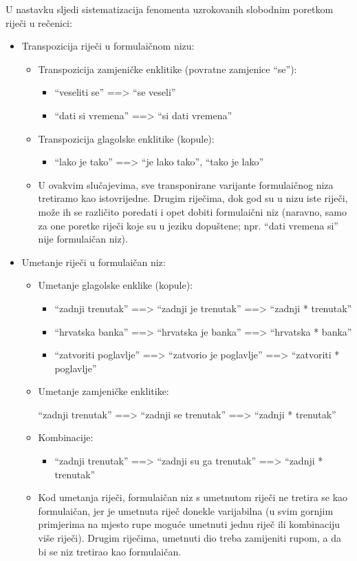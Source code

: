 \documentclass[12pt]{article}
\begin{document}
U nastavku sljedi sistematizacija fenomenta uzrokovanih slobodnim poretkom riječi u rečenici:

\begin{itemize}

\item Transpozicija riječi u formulaičnom nizu:
\begin{itemize}
\item Transpozicija zamjeničke enklitike (povratne zamjenice ``se''):
\begin{itemize}
\item ``veseliti se'' ==> ``se veseli''
\item  ``dati si vremena'' ==> ``si dati vremena''
\end{itemize}
\item Transpozicija glagolske enklitike (kopule):
\begin{itemize}
\item ``lako je tako'' ==> ``je lako tako'', ``tako je lako''
\end{itemize}
\item U ovakvim slučajevima, sve transponirane varijante formulaičnog niza tretiramo kao
istovrijedne. Drugim riječima, dok god su u nizu iste riječi, može ih se različito poredati i opet
dobiti formulaični niz (naravno, samo za one poretke riječi koje su u jeziku dopuštene; npr.
``dati vremena si'' nije formulaičan niz).
\end{itemize}

\item Umetanje riječi u formulaičan niz:

\begin{itemize}
\item Umetanje glagolske enklike (kopule):
\begin{itemize}
\item ``zadnji trenutak'' ==> ``zadnji je trenutak'' ==> ``zadnji * trenutak''
\item ``hrvatska banka'' ==> ``hrvatska je banka'' ==> ``hrvatska * banka''
\item ``zatvoriti poglavlje'' ==> ``zatvorio je poglavlje'' ==> ``zatvoriti * poglavlje''
\end{itemize} 
\item Umetanje zamjeničke enklitike:
\begin{itemize}
``zadnji trenutak'' ==> ``zadnji se trenutak'' ==> ``zadnji * trenutak''
\end{itemize}
\item Kombinacije:
\begin{itemize}
\item ``zadnji trenutak'' ==> ``zadnji su ga trenutak'' ==> ``zadnji * trenutak''
\end{itemize}
\item Kod umetanja riječi, formulaičan niz s umetnutom riječi ne tretira se kao formulaičan, jer je
umetnuta riječ donekle varijabilna (u svim gornjim primjerima na mjesto rupe moguće umetnuti
jednu riječ ili kombinaciju više riječi). Drugim riječima, umetnuti dio treba zamijeniti rupom, a
da bi se niz tretirao kao formulaičan.
\end{itemize}
\end{itemize}
\end{document}
